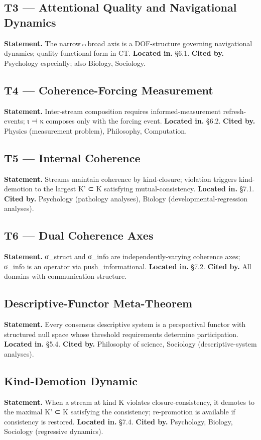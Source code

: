 \documentclass[11pt, openany]{book}
\begin{document}
\subsection{T3 --- Attentional Quality and Navigational Dynamics}
\textbf{Statement.} The narrow↔broad axis is a DOF-structure governing navigational dynamics; quality-functional form in CT.
\textbf{Located in.} §6.1.
\textbf{Cited by.} Psychology especially; also Biology, Sociology.

\subsection{T4 --- Coherence-Forcing Measurement}
\textbf{Statement.} Inter-stream composition requires informed-measurement refresh-events; ι ⊣ κ composes only with the forcing event.
\textbf{Located in.} §6.2.
\textbf{Cited by.} Physics (measurement problem), Philosophy, Computation.

\subsection{T5 --- Internal Coherence}
\textbf{Statement.} Streams maintain coherence by kind-closure; violation triggers kind-demotion to the largest K' ⊂ K satisfying mutual-consistency.
\textbf{Located in.} §7.1.
\textbf{Cited by.} Psychology (pathology analyses), Biology (developmental-regression analyses).

\subsection{T6 --- Dual Coherence Axes}
\textbf{Statement.} σ\_\allowbreak{}struct and σ\_\allowbreak{}info are independently-varying coherence axes; σ\_\allowbreak{}info is an operator via push\_\allowbreak{}informational.
\textbf{Located in.} §7.2.
\textbf{Cited by.} All domains with communication-structure.

\subsection{Descriptive-Functor Meta-Theorem}
\textbf{Statement.} Every consensus descriptive system is a perspectival functor with structured null space whose threshold requirements determine participation.
\textbf{Located in.} §5.4.
\textbf{Cited by.} Philosophy of science, Sociology (descriptive-system analyses).

\subsection{Kind-Demotion Dynamic}
\textbf{Statement.} When a stream at kind K violates closure-consistency, it demotes to the maximal K' ⊂ K satisfying the consistency; re-promotion is available if consistency is restored.
\textbf{Located in.} §7.4.
\textbf{Cited by.} Psychology, Biology, Sociology (regressive dynamics).
\end{document}
